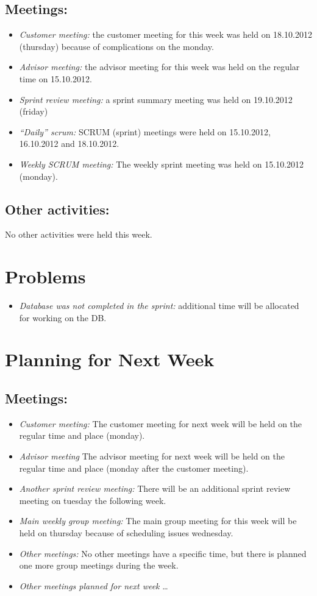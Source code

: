 \subsection*{Meetings:}
\begin{itemize}
\item \emph{Customer meeting:} the customer meeting for this week was held on 18.10.2012 (thursday) because of complications on the monday.
\item \emph{Advisor meeting:} the advisor meeting for this week was held on the regular time on 15.10.2012.
\item \emph{Sprint review meeting:} a sprint summary meeting was held on 19.10.2012 (friday)
\item \emph{``Daily'' scrum:} SCRUM (sprint) meetings were held on 15.10.2012, 16.10.2012 and 18.10.2012.
\item \emph{Weekly SCRUM meeting:} The weekly sprint meeting was held on 15.10.2012 (monday).
\end{itemize}

\subsection*{Other activities:}
No other activities were held this week.

\section*{Problems}
\begin{itemize}
\item \emph{Database was not completed in the sprint:} additional time will be allocated for working on the DB.
\end{itemize}

\section*{Planning for Next Week}
\subsection*{Meetings:}
\begin{itemize}
\item \emph{Customer meeting:} The customer meeting for next week will be held on the regular time and place (monday).
\item \emph{Advisor meeting} The advisor meeting for next week will be held on the regular time and place (monday after the customer meeting).
\item \emph{Another sprint review meeting:} There will be an additional sprint review meeting on tuesday the following week.
\item \emph{Main weekly group meeting:} The main group meeting for this week will be held on thursday because of scheduling issues wednesday.
\item \emph{Other meetings:} No other meetings have a specific time, but there is planned one more group meetings during the week.
\item \emph{Other meetings planned for next week} \ldots
\end{itemize}

